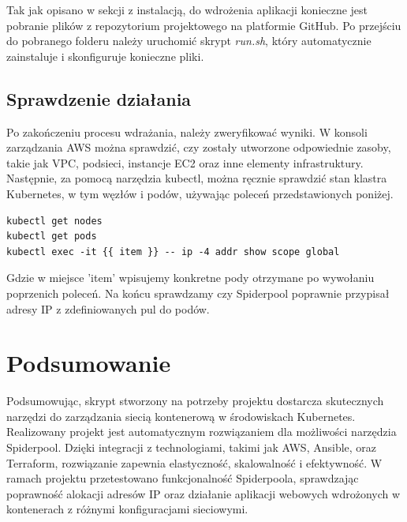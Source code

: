 \documentclass[onecolumn,12pt]{article}
\begin{document}
Tak jak opisano w sekcji z instalacją, do wdrożenia aplikacji konieczne jest pobranie plików z 
repozytorium projektowego na platformie GitHub. Po przejściu do pobranego folderu należy 
uruchomić skrypt \textit{run.sh}, który automatycznie zainstaluje i skonfiguruje konieczne pliki.

\subsection{Sprawdzenie działania}
Po zakończeniu procesu wdrażania, należy zweryfikować wyniki. W konsoli zarządzania AWS można
sprawdzić, czy zostały utworzone odpowiednie zasoby, takie jak VPC, podsieci, instancje EC2 oraz
inne elementy infrastruktury. Następnie, za pomocą narzędzia kubectl, można ręcznie sprawdzić stan
klastra Kubernetes, w tym węzłów i podów, używając poleceń przedstawionych poniżej.

\begin{verbatim}
kubectl get nodes
kubectl get pods
kubectl exec -it {{ item }} -- ip -4 addr show scope global
\end{verbatim}

Gdzie w miejsce 'item' wpisujemy konkretne pody otrzymane po wywołaniu poprzenich poleceń.
Na końcu sprawdzamy czy Spiderpool poprawnie przypisał adresy IP z zdefiniowanych pul do podów. 

\section{Podsumowanie}

Podsumowując, skrypt stworzony na potrzeby projektu dostarcza skutecznych narzędzi do zarządzania siecią kontenerową w środowiskach Kubernetes. Realizowany projekt jest automatycznym rozwiązaniem
dla możliwości narzędzia Spiderpool. Dzięki integracji z technologiami, takimi jak AWS, Ansible, oraz Terraform, rozwiązanie zapewnia elastyczność, skalowalność i efektywność. W ramach projektu przetestowano funkcjonalność Spiderpoola, sprawdzając poprawność alokacji adresów IP oraz 
działanie aplikacji webowych wdrożonych w kontenerach z różnymi konfiguracjami sieciowymi.

%
\end{document}
